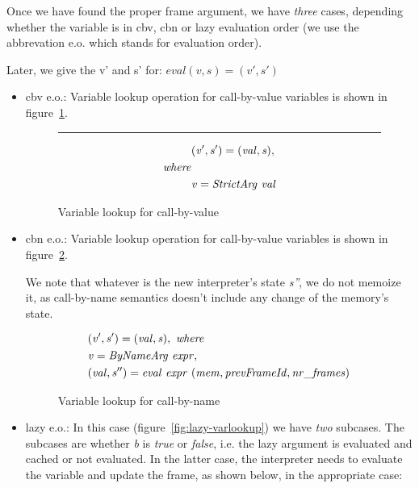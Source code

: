 \documentclass[diploma]{softlab-thesis}
\begin{document}
Once we have found the proper frame argument, we have \textit{three} cases, depending whether the variable is in cbv, cbn or lazy 
evaluation order (we use the abbrevation e.o. which stands for evaluation order). 

Later, we give the v' and s' for:
  $ \mathit{eval (v, s) = (v', s')} $

  \begin{itemize}
    \item cbv e.o.: Variable lookup operation for call-by-value 
          variables is shown in figure~\ref{fig:cbv-varLookup}.
      \begin{figure}[t]
      \hrule
        \begin{align*}
           & \mathit{(v', s') = (val, s),} \\
           \mathit{where} \\ 
           & \mathit{v = StrictArg \hfill\ val}
        \end{align*}
      \caption{Variable lookup for call-by-value\label{fig:cbv-varLookup}}
      \end{figure}
    \item cbn e.o.: Variable lookup operation for call-by-value 
    variables is shown in figure~\ref{fig:cbn-varLookup}.

    We note that whatever is the new interpreter's state \textit{s''}, we do not memoize it, as call-by-name semantics 
    doesn't include any change of the memory's state.

    \begin{figure}[t]
      \begin{align*}
        & \mathit{ (v', s') = (val, s), \hfill\ where } \\
        & \mathit{ v = ByNameArg \hfill\ expr, } \\
        & \mathit{(val, s'') = eval \hfill\ expr \hfill\ (mem, prevFrameId, nr\_frames)} \\
      \end{align*}
    \caption{Variable lookup for call-by-name\label{fig:cbn-varLookup}}
    \end{figure}      

    \item lazy e.o.: In this case (figure~\ref{fig:lazy-varlookup}) we have \textit{two} subcases.
    The subcases are whether \textit{b} is \textit{true} or \textit{false}, i.e. the lazy argument is evaluated and cached or
    not evaluated. In the latter case, the interpreter needs to evaluate the variable and update the frame, as shown below,
    in the appropriate case:


\end{itemize}
\end{document}
